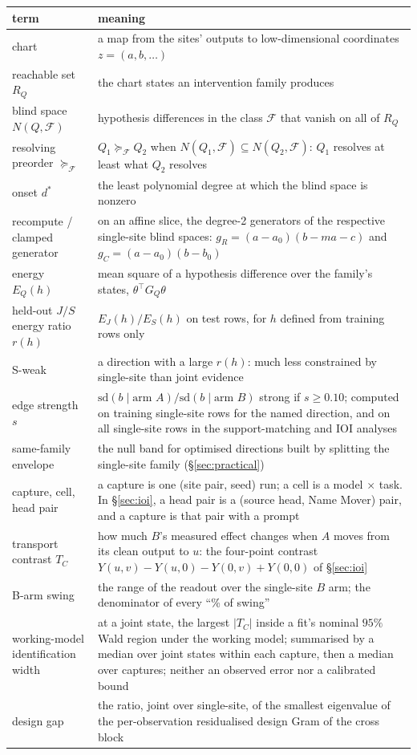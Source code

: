 \begin{center}\small
\begin{tabularx}{\textwidth}{@{}l>{\raggedright\arraybackslash}X@{}}
\toprule
term & meaning \\
\midrule
chart & a map from the sites' outputs to low-dimensional coordinates $z=(a,b,\dots)$ \\
reachable set $R_Q$ & the chart states an intervention family produces \\
blind space $N(Q,\mathcal F)$ & hypothesis differences in the class $\mathcal F$ that vanish on all of $R_Q$ \\
resolving preorder $\succeq_{\mathcal F}$ & $Q_1\succeq_{\mathcal F}Q_2$ when $N(Q_1,\mathcal F)\subseteq N(Q_2,\mathcal F)$: $Q_1$ resolves at least what $Q_2$ resolves \\
onset $d^*$ & the least polynomial degree at which the blind space is nonzero \\
recompute / clamped generator & on an affine slice, the degree-2 generators of the respective single-site blind spaces: $g_R=(a-a_0)(b-ma-c)$ and $g_C=(a-a_0)(b-b_0)$ \\
energy $E_Q(h)$ & mean square of a hypothesis difference over the family's states, $\theta^\top G_Q\theta$ \\
held-out $J/S$ energy ratio $r(h)$ & $E_J(h)/E_S(h)$ on test rows, for $h$ defined from training rows only \\
S-weak & a direction with a large $r(h)$: much less constrained by single-site than joint evidence \\
edge strength $s$ & $\mathrm{sd}(b\mid\text{arm }A)/\mathrm{sd}(b\mid\text{arm }B)$ strong if $s\ge0.10$; computed on training single-site rows for the named direction, and on all single-site rows in the support-matching and IOI analyses \\
same-family envelope & the null band for optimised directions built by splitting the single-site family (\S\ref{sec:practical}) \\
capture, cell, head pair & a capture is one (site pair, seed) run; a cell is a model $\times$ task. In \S\ref{sec:ioi}, a head pair is a (source head, Name Mover) pair, and a capture is that pair with a prompt \\
transport contrast $T_C$ & how much $B$'s measured effect changes when $A$ moves from its clean output to $u$: the four-point contrast $Y(u,v)-Y(u,0)-Y(0,v)+Y(0,0)$ of \S\ref{sec:ioi} \\
B-arm swing & the range of the readout over the single-site $B$ arm; the denominator of every ``\% of swing'' \\
working-model identification width & at a joint state, the largest $|T_C|$ inside a fit's nominal $95\%$ Wald region under the working model; summarised by a median over joint states within each capture, then a median over captures; neither an observed error nor a calibrated bound \\
design gap & the ratio, joint over single-site, of the smallest eigenvalue of the per-observation residualised design Gram of the cross block \\
\bottomrule
\end{tabularx}
\end{center}


